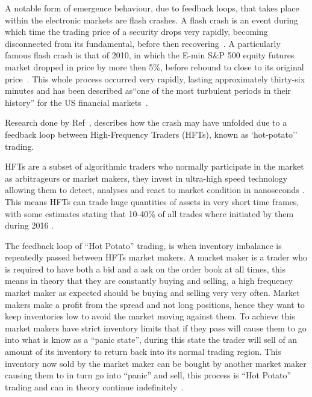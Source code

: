 \documentclass{article}
\begin{document}
A notable form of emergence behaviour, due to feedback loops, that takes place within the electronic markets are flash crashes. A flash crash is an event during which time the trading price of a security drops very rapidly, becoming disconnected from its fundamental, before then recovering~\cite{rareeventflashcrash}. A particularly famous flash crash is that of 2010, in which the E-min S\&P 500 equity futures market dropped in price by more then 5\%, before rebound to close to its original price~\cite{SECreport_delays, rareeventflashcrash}. This whole process occurred very rapidly, lasting approximately thirty-six minutes and has been described as``one of the most turbulent periods in their history'' for the US financial markets~\cite{Impact_hft}.

Research done by Ref~\cite{DynamicCoupling_Chris, otherabmflash}, describes how the crash may have unfolded due to a feedback loop between High-Frequency Traders (HFTs), known as `hot-potato'' trading.

HFTs are a subset of algorithmic traders who normally participate in the market as arbitrageurs or market makers, they invest in ultra-high speed technology allowing them to detect, analyses and react to market condition in nanoseconds \cite{hftinformation1}. This means HFTs can trade huge quantities of assets in very short time frames, with some estimates stating that 10-40\% of all trades where initiated by them during 2016 \cite{hftmarketparticipation}.

The feedback loop of ``Hot Potato'' trading, is when inventory imbalance is repeatedly passed between HFTs market makers. A market maker is a trader who is required to have both a bid and a ask on the order book at all times, this means in theory that they are constantly buying and selling, a high frequency market maker as expected should be buying and selling very very often. Market makers make a profit from the spread and not long positions, hence they want to keep inventories low to avoid the market moving against them. To achieve this market makers have strict inventory limits that if they pass will cause them to go into what is know as a ``panic state'', during this state the trader will sell of an amount of its inventory to return back into its normal trading region. This inventory now sold by the market maker can be bought by another market maker causing them to in turn go into ``panic'' and sell, this process is ``Hot Potato'' trading and can in theory continue indefinitely~\cite{Elias_Paper}.
\end{document}
